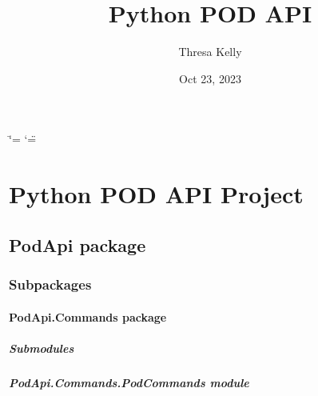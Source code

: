\documentclass[letterpaper,10pt,english]{sphinxmanual}
\title{Python POD API}
\date{Oct 23, 2023}
\author{Thresa Kelly}
\begin{document}
\ifdefined\shorthandoff
  \ifnum\catcode`\=\string=\active\shorthandoff{=}\fi
  \ifnum\catcode`\"=\active{}\fi
\fi

\pagestyle{empty}
\sphinxmaketitle
\pagestyle{plain}
\sphinxtableofcontents
\pagestyle{normal}
\label{\detokenize{index::doc}}


\sphinxstepscope


\chapter{Python POD API Project}
\label{\detokenize{modules:python-pod-api-project}}\label{\detokenize{modules::doc}}
\sphinxstepscope


\section{PodApi package}
\label{\detokenize{PodApi:podapi-package}}\label{\detokenize{PodApi::doc}}

\subsection{Subpackages}
\label{\detokenize{PodApi:subpackages}}
\sphinxstepscope


\subsubsection{PodApi.Commands package}
\label{\detokenize{PodApi.Commands:podapi-commands-package}}\label{\detokenize{PodApi.Commands::doc}}

\paragraph{Submodules}
\label{\detokenize{PodApi.Commands:submodules}}

\paragraph{PodApi.Commands.PodCommands module}
\label{\detokenize{PodApi.Commands:module-PodApi.Commands.PodCommands}}\label{\detokenize{PodApi.Commands:podapi-commands-podcommands-module}}
\end{document}
